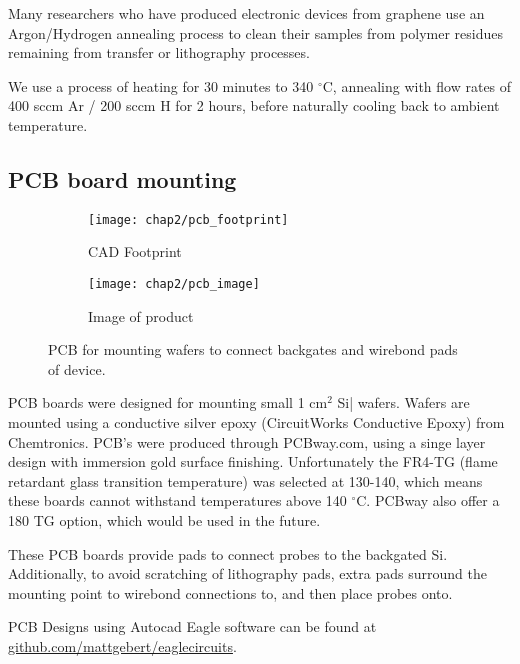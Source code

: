 \documentclass[../../Matt_Gebert_Honours_Thesis.tex]{subfiles}
\begin{document}
	Many researchers who have produced electronic devices from graphene use an Argon/Hydrogen annealing process to clean their samples from polymer residues remaining from transfer or lithography processes. \cite{lin_graphene_2012,cooper_experimental_2012,soldano_production_2010,chen_intrinsic_2008}
	
	We use a process of heating for 30 minutes to 340 $^\circ$C, annealing with flow rates of 400 sccm Ar / 200 sccm H for 2 hours, before naturally cooling back to ambient temperature.

	\subsection{PCB board mounting}\label{sec:pcb}
	\begin{figure}[H]
		\centering
		\begin{subfigure}{0.45\textwidth}
			\centering
			\texttt{[image: chap2/pcb\_footprint]}
			\caption{CAD Footprint}
		\end{subfigure}
		\begin{subfigure}{0.45\textwidth}
			\centering
			\texttt{[image: chap2/pcb\_image]}
			\caption{Image of product}
		\end{subfigure}
		\caption[PCB wafter mount]{PCB for mounting wafers to connect backgates and wirebond pads of device.}
	\end{figure}
	PCB boards were designed for mounting small 1 cm$^2$ Si|\silicondioxide{} wafers. Wafers are mounted using a conductive silver epoxy (CircuitWorks Conductive Epoxy) from Chemtronics. PCB's were produced through PCBway.com, using a singe layer design with immersion gold surface finishing. Unfortunately the FR4-TG (flame retardant glass transition temperature) was selected at 130-140, which means these boards cannot withstand temperatures above 140 $^\circ$C. PCBway also offer a 180 TG option, which would be used in the future.
	
	These PCB boards provide pads to connect probes to the backgated Si. Additionally, to avoid scratching of lithography pads, extra pads surround the mounting point to wirebond connections to, and then place probes onto.
	
	PCB Designs using Autocad Eagle software can be found at \href{https://www.github.com/mattgebert/eaglecircuits}{github.com/mattgebert/eaglecircuits}.
\end{document}
